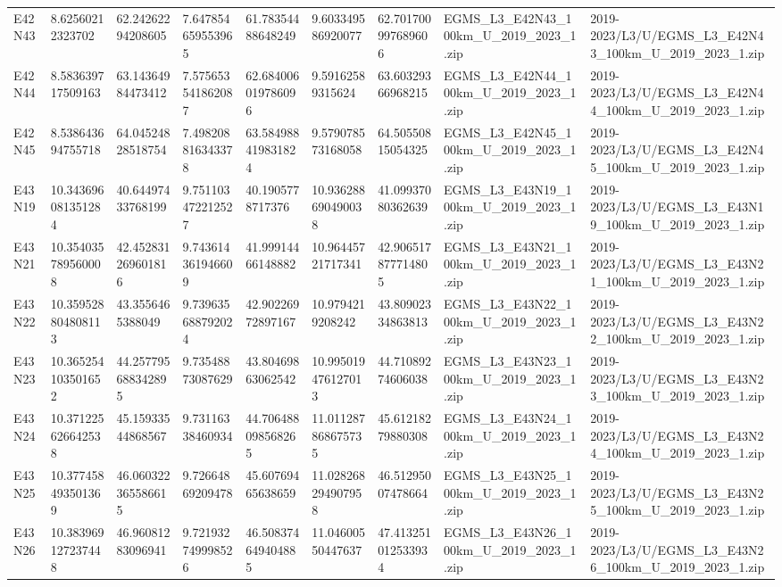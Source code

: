 \begin{landscape}
\begin{longtable}{lllllllll}
E42N43 & 8.62560212323702 & 62.24262294208605 & 7.647854659553965 & 61.78354488648249 & 9.603349586920077 & 62.701700997689606 & EGMS\_L3\_E42N43\_100km\_U\_2019\_2023\_1.zip & 2019-2023/L3/U/EGMS\_L3\_E42N43\_100km\_U\_2019\_2023\_1.zip \\
E42N44 & 8.583639717509163 & 63.14364984473412 & 7.575653541862087 & 62.684006019786096 & 9.59162589315624 & 63.60329366968215 & EGMS\_L3\_E42N44\_100km\_U\_2019\_2023\_1.zip & 2019-2023/L3/U/EGMS\_L3\_E42N44\_100km\_U\_2019\_2023\_1.zip \\
E42N45 & 8.538643694755718 & 64.04524828518754 & 7.498208816343378 & 63.584988419831824 & 9.579078573168058 & 64.50550815054325 & EGMS\_L3\_E42N45\_100km\_U\_2019\_2023\_1.zip & 2019-2023/L3/U/EGMS\_L3\_E42N45\_100km\_U\_2019\_2023\_1.zip \\
E43N19 & 10.343696081351284 & 40.64497433768199 & 9.751103472212527 & 40.1905778717376 & 10.936288690490038 & 41.09937080362639 & EGMS\_L3\_E43N19\_100km\_U\_2019\_2023\_1.zip & 2019-2023/L3/U/EGMS\_L3\_E43N19\_100km\_U\_2019\_2023\_1.zip \\
E43N21 & 10.354035789560008 & 42.452831269601816 & 9.743614361946609 & 41.99914466148882 & 10.96445721717341 & 42.906517877714805 & EGMS\_L3\_E43N21\_100km\_U\_2019\_2023\_1.zip & 2019-2023/L3/U/EGMS\_L3\_E43N21\_100km\_U\_2019\_2023\_1.zip \\
E43N22 & 10.359528804808113 & 43.3556465388049 & 9.739635688792024 & 42.90226972897167 & 10.9794219208242 & 43.80902334863813 & EGMS\_L3\_E43N22\_100km\_U\_2019\_2023\_1.zip & 2019-2023/L3/U/EGMS\_L3\_E43N22\_100km\_U\_2019\_2023\_1.zip \\
E43N23 & 10.365254103501652 & 44.257795688342895 & 9.73548873087629 & 43.80469863062542 & 10.995019476127013 & 44.71089274606038 & EGMS\_L3\_E43N23\_100km\_U\_2019\_2023\_1.zip & 2019-2023/L3/U/EGMS\_L3\_E43N23\_100km\_U\_2019\_2023\_1.zip \\
E43N24 & 10.371225626642538 & 45.15933544868567 & 9.73116338460934 & 44.706488098568265 & 11.011287868675735 & 45.61218279880308 & EGMS\_L3\_E43N24\_100km\_U\_2019\_2023\_1.zip & 2019-2023/L3/U/EGMS\_L3\_E43N24\_100km\_U\_2019\_2023\_1.zip \\
E43N25 & 10.377458493501369 & 46.060322365586615 & 9.72664869209478 & 45.60769465638659 & 11.028268294907958 & 46.51295007478664 & EGMS\_L3\_E43N25\_100km\_U\_2019\_2023\_1.zip & 2019-2023/L3/U/EGMS\_L3\_E43N25\_100km\_U\_2019\_2023\_1.zip \\
E43N26 & 10.383969127237448 & 46.96081283096941 & 9.721932749998526 & 46.508374649404885 & 11.04600550447637 & 47.413251012533934 & EGMS\_L3\_E43N26\_100km\_U\_2019\_2023\_1.zip & 2019-2023/L3/U/EGMS\_L3\_E43N26\_100km\_U\_2019\_2023\_1.zip \\

\end{longtable}
\end{landscape}
